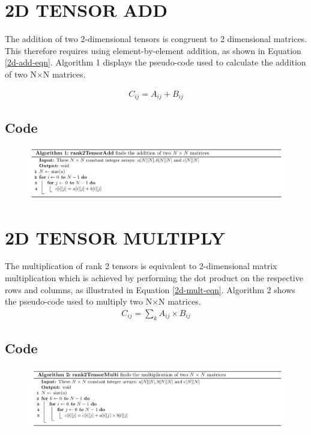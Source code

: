 \section{2D TENSOR ADD}
The addition of two 2-dimensional tensors is congruent to 2 dimensional matrices. This therefore requires using element-by-element addition, as shown in Equation \ref{2d-add-eqn}. Algorithm 1 displays the pseudo-code used to calculate the addition of two N$\times$N matrices.

\begin{align}
C_{ij} = A_{ij} + B_{ij} \label{2d-add-eqn}
\end{align}
\subsection{Code}
\begin{figure}[H]
\includegraphics[width=\textwidth]{build/Algo1.png}
\end{figure}
\section{2D TENSOR MULTIPLY}
The multiplication of rank 2 tensors is equivalent to 2-dimensional matrix multiplication which is achieved by performing the dot product on the respective
rows and columns, as illustrated in Equation \ref{2d-mult-eqn}. Algorithm 2 shows the pseudo-code used to multiply two N$\times$N matrices.
\begin{align}
C_{ij} = \sum_{k} A_{ij} \times B_{ij} \label{2d-mult-eqn}
\end{align}

\subsection{Code}
\begin{figure}[H]
\includegraphics[width=\textwidth]{build/Algo2.png}
\end{figure}

